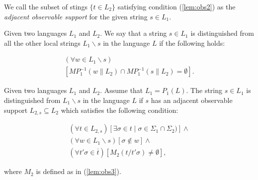 We call the subset of stings $\{t \in L_2\}$ satisfying condition
(\ref{lem:obs2}) as the \emph{adjacent observable support} for the given string
$s \in L_1$.

\begin{definition} Given two languages $L_1$ and $L_2$. We say that a string $s
\in L_{1}$ is distinguished from all the other local strings $L_1\backslash s$
in the language $L$ if the following holds:
\end{definition}
\begin{equation}
\label{def:dist}
\begin{array}{l}
  (\forall w \in L_1\backslash s)\\
  	\left[ MP_1^{-1}(w \parallel L_2) \cap MP_1^{-1}(s\parallel L_2) = \emptyset
  	\right].
\end{array}
\end{equation}

\begin{lemma}
\label{lem:distinguished_for_2}
Given two languages $L_1$ and $L_2$. Assume that $L_1 = P_1(L)$. The string $s
\in L_1$ is distinguished from $L_1\backslash s$ in the language $L$ if $s$ has
an adjacent observable support $L_{2,s} \subseteq L_2$ which
satisfies the following condition:
\end{lemma}
\begin{subequations}
\begin{align}
	(\forall t \in L_{2,s})
	\left[ \exists \sigma \in t \mid \sigma \in \Sigma_1 \cap \Sigma_2)\right]
	\land
	\label{lem:dist1}
	\\
	(\forall w \in L_1\backslash s)\left[\sigma \not \in w \right]
	\label{lem:dist2} \land
	\\
	(\forall t'\sigma \in \overline{t})
	[M_2(t / t'\sigma) \neq \emptyset]
	\label{lem:dist3},
\end{align}
\end{subequations}

where $M_2$ is defined as in (\ref{lem:obs3}). 

